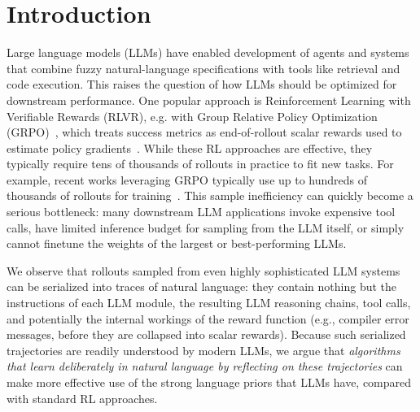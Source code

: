 \documentclass{article} %
\begin{document}
\section{Introduction}
\vspace{-2.0mm}
Large language models (LLMs) have enabled development of agents and systems that combine fuzzy natural-language specifications with tools like retrieval and code execution. This raises the question of how LLMs should be optimized for downstream performance. One popular approach is Reinforcement Learning with Verifiable Rewards (RLVR), e.g. with Group Relative Policy Optimization (GRPO)~\citep{grpo_paper}, which treats success metrics as end-of-rollout scalar rewards used to estimate policy gradients~\citep{lambert2025policy}. While these RL approaches are effective, they typically require tens of thousands of rollouts in practice to fit new tasks. For example, recent works leveraging GRPO typically use up to hundreds of thousands of rollouts for training~\citep{chen_spectral_2025, wu_reinforcing_2025, zhang_lets_2025, jin_search-r1_2025, si_teaching_2025, wang_acting_2025, chen_research_2025, sha_sem_2025, lin_knowledgeable-r1_2025, peng_verif_2025, song_r1-searcher_2025}. 
This sample inefficiency can quickly become a serious bottleneck: many downstream LLM applications invoke expensive tool calls, have limited inference budget for sampling from the LLM itself, or simply cannot finetune the weights of the largest or best-performing LLMs.

We observe that rollouts sampled from even highly sophisticated LLM systems can be serialized into traces of natural language: they contain nothing but the instructions of each LLM module, the resulting LLM reasoning chains, tool calls, and potentially the internal workings of the reward function (e.g., compiler error messages, before they are collapsed into scalar rewards). Because such serialized trajectories are readily understood by modern LLMs, we argue that \textit{algorithms that learn deliberately in natural language by reflecting on these trajectories} can make more effective use of the strong language priors that LLMs have, compared with standard RL approaches. %


\end{document}
